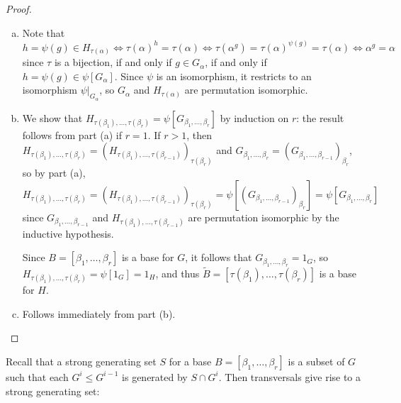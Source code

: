{    \begin{proof}
        \begin{enumerate}[(a)]
            \item Note that
                  $$h = \psi(g) \in H_{\tau(\alpha)} \iff \tau(\alpha)^h = \tau(\alpha) \iff \tau(\alpha^g) = \tau(\alpha)^{\psi(g)} = \tau(\alpha) \iff \alpha^g = \alpha$$
                  since $\tau$ is a bijection, if and only if $g \in G_\alpha$, if and only if $h = \psi(g) \in \psi[G_\alpha].$ Since $\psi$ is an isomorphism, it restricts to an isomorphism $\psi|_{G_\alpha}$, so $G_\alpha$ and $H_{\tau(\alpha)}$ are permutation isomorphic.
            \item We show that $H_{\tau(\beta_1),\dotsc,\tau(\beta_r)} = \psi[G_{\beta_1,\dotsc,\beta_r}]$ by induction on $r$: the result follows from part (a) if $r = 1$. If $r > 1$, then $H_{\tau(\beta_1),\dotsc,\tau(\beta_r)} = (H_{\tau(\beta_1),\dotsc,\tau(\beta_{r-1})})_{\tau(\beta_r)}$ and $G_{\beta_1,\dotsc,\beta_r} = (G_{\beta_1,\dotsc,\beta_{r-1}})_{\beta_r}$, so by part (a),
                  $$H_{\tau(\beta_1),\dotsc,\tau(\beta_r)} = (H_{\tau(\beta_1),\dotsc,\tau(\beta_{r-1})})_{\tau(\beta_r)} = \psi[(G_{\beta_1,\dotsc,\beta_{r-1}})_{\beta_r}] = \psi[G_{\beta_1,\dotsc,\beta_r}]$$
                  since $G_{\beta_1,\dotsc,\beta_{r-1}}$ and $H_{\tau(\beta_1),\dotsc,\tau(\beta_{r-1})}$ are permutation isomorphic by the inductive hypothesis.

                  Since $B = [\beta_1,\dotsc,\beta_r]$ is a base for $G$, it follows that $G_{\beta_1,\dotsc,\beta_r} = 1_G$, so $H_{\tau(\beta_1),\dotsc,\tau(\beta_r)} = \psi[1_G] = 1_H$, and thus $\tilde B = [\tau(\beta_1),\dotsc,\tau(\beta_r)]$ is a base for $H$.
            \item Follows immediately from part (b).
        \end{enumerate}
    \end{proof}}

Recall that a strong generating set $S$ for a base $B = [\beta_1,\dotsc,\beta_r]$ is a subset of $G$ such that each $G^i \leq G^{i-1}$ is generated by $S \cap G^i$.  Then transversals  give rise to a strong generating set:

